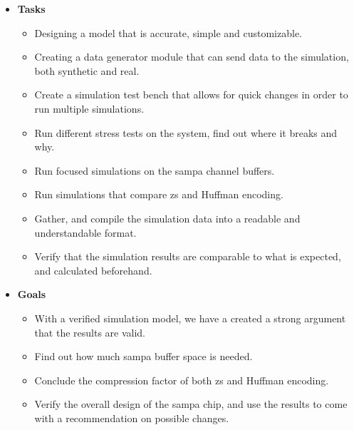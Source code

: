 \documentclass[a4paper, 12pt]{report}
\begin{document}
\begin{itemize}
	\item \textbf{Tasks}
		\begin{itemize}
			\item Designing a model that is accurate, simple and customizable.
			\item Creating a data generator module that can send data to the simulation, both synthetic and real.
			\item Create a simulation test bench that allows for quick changes in order to run multiple simulations.
			\item Run different stress tests on the system, find out where it breaks and why.
			\item Run focused simulations on the \gls{sampa} channel buffers.
			\item Run simulations that compare \gls{zs} and Huffman encoding.
			\item Gather, and compile the simulation data into a readable and understandable format.
			\item Verify that the simulation results are comparable to what is expected, and calculated beforehand.
		\end{itemize}
	\item \textbf{Goals}
	\begin{itemize}
		\item With a verified simulation model, we have a created a strong argument that the results are valid.
		\item Find out how much \gls{sampa} buffer space is needed.
		\item Conclude the compression factor of both \gls{zs} and Huffman encoding.
		\item Verify the overall design of the \gls{sampa} chip, and use the results to come with a recommendation on possible changes.
	\end{itemize}
\end{itemize}
\end{document}
